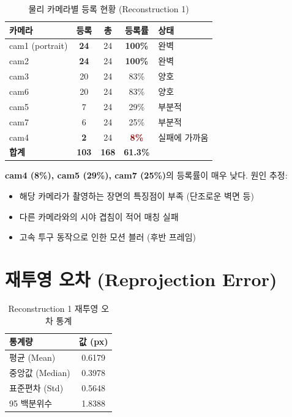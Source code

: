 \documentclass[11pt, a4paper]{report}
\begin{document}
\begin{table}[H]
\centering
\caption{물리 카메라별 등록 현황 (Reconstruction 1)}
\renewcommand{\arraystretch}{1.3}
\begin{tabular}{lcccl}
\toprule
\textbf{카메라} & \textbf{등록} & \textbf{총} & \textbf{등록률} & \textbf{상태} \\
\midrule
cam1 (portrait) & \textbf{24} & 24 & \textcolor{thmgreen}{\textbf{100\%}} & 완벽 \\
cam2 & \textbf{24} & 24 & \textcolor{thmgreen}{\textbf{100\%}} & 완벽 \\
cam3 & 20 & 24 & \textcolor{thmgreen}{83\%} & 양호 \\
cam6 & 20 & 24 & \textcolor{thmgreen}{83\%} & 양호 \\
cam5 & 7 & 24 & \textcolor{noteorange}{29\%} & 부분적 \\
cam7 & 6 & 24 & \textcolor{noteorange}{25\%} & 부분적 \\
cam4 & \textbf{2} & 24 & \textcolor{darkred}{\textbf{8\%}} & 실패에 가까움 \\
\midrule
\textbf{합계} & \textbf{103} & \textbf{168} & \textbf{61.3\%} & \\
\bottomrule
\end{tabular}
\end{table}

\begin{warningbox}
\textbf{cam4 (8\%), cam5 (29\%), cam7 (25\%)}의 등록률이 매우 낮다.
원인 추정:
\begin{itemize}[nosep]
  \item 해당 카메라가 촬영하는 장면의 특징점이 부족 (단조로운 벽면 등)
  \item 다른 카메라와의 시야 겹침이 적어 매칭 실패
  \item 고속 투구 동작으로 인한 모션 블러 (후반 프레임)
\end{itemize}
\end{warningbox}


\section{재투영 오차 (Reprojection Error)}

\begin{table}[H]
\centering
\caption{Reconstruction 1 재투영 오차 통계}
\renewcommand{\arraystretch}{1.3}
\begin{tabular}{lc}
\toprule
\textbf{통계량} & \textbf{값 (px)} \\
\midrule
평균 (Mean) & 0.6179 \\
중앙값 (Median) & 0.3978 \\
표준편차 (Std) & 0.5648 \\
95 백분위수 & 1.8388 \\
\bottomrule
\end{tabular}
\end{table}
\end{document}
